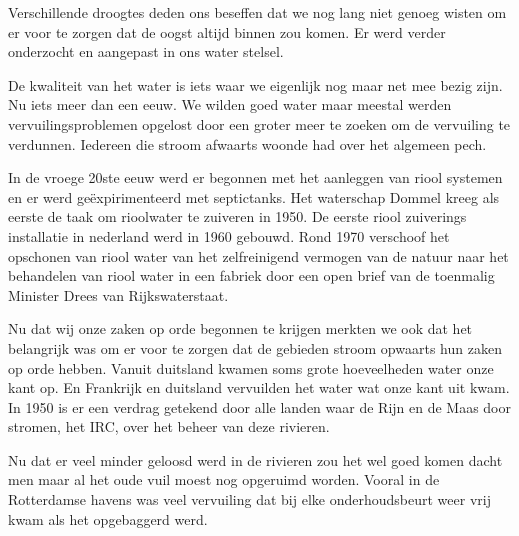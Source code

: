 Verschillende droogtes deden ons beseffen dat we nog lang niet genoeg wisten om er voor te zorgen dat de oogst altijd binnen zou komen.
Er werd verder onderzocht en aangepast in ons water stelsel.

De kwaliteit van het water is iets waar we eigenlijk nog maar net mee bezig zijn.
Nu iets meer dan een eeuw.
We wilden goed water maar meestal werden vervuilingsproblemen opgelost door een groter meer te zoeken om de vervuiling te verdunnen.
Iedereen die stroom afwaarts woonde had over het algemeen pech.

In de vroege 20ste eeuw werd er begonnen met het aanleggen van riool systemen en er werd ge\"expirimenteerd met septictanks.
Het waterschap Dommel kreeg als eerste de taak om rioolwater te zuiveren in 1950.
De eerste riool zuiverings installatie in nederland werd in 1960 gebouwd.
Rond 1970 verschoof het opschonen van riool water van het zelfreinigend vermogen van de natuur naar het behandelen van riool water in een fabriek door een open brief van de toenmalig Minister Drees van Rijkswaterstaat.

Nu dat wij onze zaken op orde begonnen te krijgen merkten we ook dat het belangrijk was om er voor te zorgen dat de gebieden stroom opwaarts hun zaken op orde hebben.
Vanuit duitsland kwamen soms grote hoeveelheden water onze kant op.
En Frankrijk en duitsland vervuilden het water wat onze kant uit kwam.
In 1950 is er een verdrag getekend door alle landen waar de Rijn en de Maas door stromen, het IRC, over het beheer van deze rivieren.

Nu dat er veel minder geloosd werd in de rivieren zou het wel goed komen dacht men maar al het oude vuil moest nog opgeruimd worden. 
Vooral in de Rotterdamse havens was veel vervuiling dat bij elke onderhoudsbeurt weer vrij kwam als het opgebaggerd werd.


